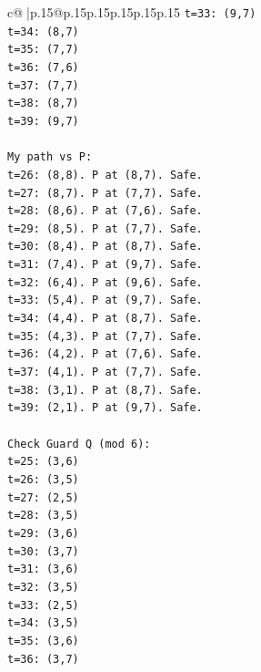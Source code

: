 \documentclass{article}
\begin{document}
{\begin{supertabular}{c@{$\;$}|p{.15\linewidth}@{}p{.15\linewidth}p{.15\linewidth}p{.15\linewidth}p{.15\linewidth}p{.15\linewidth}}
{{{\texttt{t=33: (9,7)} \\
\texttt{t=34: (8,7)} \\
\texttt{t=35: (7,7)} \\
\texttt{t=36: (7,6)} \\
\texttt{t=37: (7,7)} \\
\texttt{t=38: (8,7)} \\
\texttt{t=39: (9,7)} \\
\\ 
\texttt{My path vs P:} \\
\texttt{t=26: (8,8). P at (8,7). Safe.} \\
\texttt{t=27: (8,7). P at (7,7). Safe.} \\
\texttt{t=28: (8,6). P at (7,6). Safe.} \\
\texttt{t=29: (8,5). P at (7,7). Safe.} \\
\texttt{t=30: (8,4). P at (8,7). Safe.} \\
\texttt{t=31: (7,4). P at (9,7). Safe.} \\
\texttt{t=32: (6,4). P at (9,6). Safe.} \\
\texttt{t=33: (5,4). P at (9,7). Safe.} \\
\texttt{t=34: (4,4). P at (8,7). Safe.} \\
\texttt{t=35: (4,3). P at (7,7). Safe.} \\
\texttt{t=36: (4,2). P at (7,6). Safe.} \\
\texttt{t=37: (4,1). P at (7,7). Safe.} \\
\texttt{t=38: (3,1). P at (8,7). Safe.} \\
\texttt{t=39: (2,1). P at (9,7). Safe.} \\
\\ 
\texttt{Check Guard Q (mod 6):} \\
\texttt{t=25: (3,6)} \\
\texttt{t=26: (3,5)} \\
\texttt{t=27: (2,5)} \\
\texttt{t=28: (3,5)} \\
\texttt{t=29: (3,6)} \\
\texttt{t=30: (3,7)} \\
\texttt{t=31: (3,6)} \\
\texttt{t=32: (3,5)} \\
\texttt{t=33: (2,5)} \\
\texttt{t=34: (3,5)} \\
\texttt{t=35: (3,6)} \\
\texttt{t=36: (3,7)} \\
}}}
\end{supertabular}}
\end{document}
